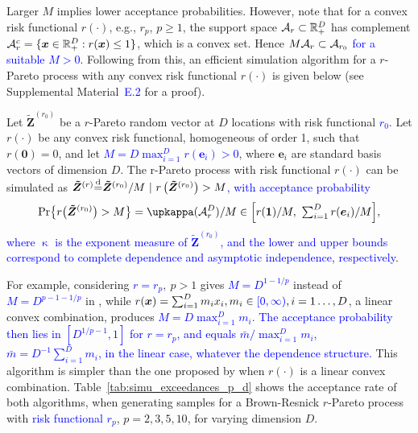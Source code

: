 \documentclass[12pt]{article}
\newcommand{\PZ}{\textcolor{blue}}
\begin{document}
Larger $M$ implies lower acceptance probabilities. 
However, note that for a convex risk functional $r(\cdot)$, e.g., $r_p$, $p\geq 1$, the support space \PZ{${\mathcal A}_r \subset \mathbb R_+^D$} has complement ${\mathcal A}_r^c=\{\bm x\in\mathbb R_+^D: r(\bm x)\leq 1\}$, which is a convex set. Hence \PZ{$M{\mathcal A}_r\subset {\mathcal A}_{r_0}$ for a suitable $M>0$}. Following from this, an efficient simulation algorithm for a $r$-Pareto process with any convex risk functional $r(\cdot)$ is given below (see Supplemental Material~\PZ{E.2} for a proof). 
%    
\begin{theorem}\label{thm:r_pareto_simulation}
Let $\bm{\tilde Z}^{(r_0)}$ be a $r$-Pareto random vector at $D$ locations with risk functional \PZ{$r_0$}. Let $r(\cdot)$ be any convex risk functional, homogeneous of order 1, such that $r(\bm 0)=0$, and let \PZ{$M=D\max_{i=1}^D r(\bm e_i)>0$}, where $\bm e_i$ are standard basis vectors of dimension $D$.
%
The r-Pareto process with risk functional $r(\cdot)$ can be simulated as \PZ{$\bm{\tilde Z}^{(r)}{\stackrel{\mathrm{d}}{=}} \bm{\tilde Z}^{(r_0)}/M\ | \ r\left(\bm{\tilde Z}^{(r_0)}\right) > M$}\PZ{, with acceptance probability
$$
\Pr\big\{r\big(\bm{\tilde Z}^{(r_0)}\big)>M\big\}=\upkappa(\calA^D_r)/M\in\Big[r(\bm 1)/M,\ \textstyle\sum_{i=1}^D r(\bm e_i)/M\Big],
$$
where $\upkappa$ is the exponent measure of $\bm{\tilde Z}^{(r_0)}$, and the lower and upper bounds correspond to complete dependence and asymptotic independence, respectively}.
\end{theorem}
%
For example, considering \PZ{$r=r_p$}$,\ p>1$ gives \PZ{$M = D^{1-1/p}$} instead of \PZ{$M=D^{p-1-1/p}$} in \citet{Dombry.etal:2024}, while $r(\bm x)=\sum_{i=1}^D m_ix_i, m_i\in \PZ{[0,\infty)},i=1\dots,D$, a linear convex combination, produces \PZ{$M=D\max_{i=1}^D m_i$}. \PZ{The acceptance probability then lies in $[D^{1/p-1},1]$ for $r=r_p$, and equals $\bar m/\max_{i=1}^D m_i$, $\bar m=D^{-1}\sum_{i=1}^D m_i$, in the linear case, whatever the dependence structure.} This algorithm is simpler than the one proposed by \citet[Proposition 1]{Dombry.etal:2024} when $r(\cdot)$ is a linear convex combination. Table~\ref{tab:simu_exceedances_p_d} shows the acceptance rate of both algorithms, when generating samples for a Brown-Resnick $r$-Pareto process with \PZ{risk functional $r_p$}, $p=2,3,5,10$, for varying dimension $D$. 
\end{document}

